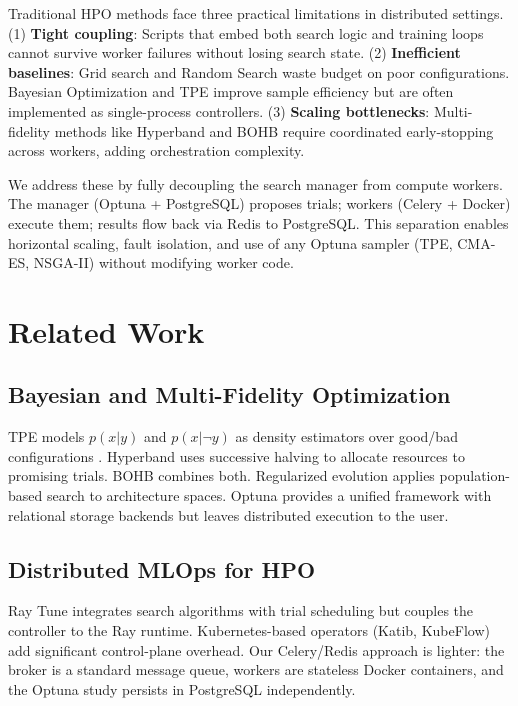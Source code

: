\documentclass[10pt,twocolumn,letterpaper]{article}
\begin{document}
Traditional HPO methods face three practical limitations in distributed settings. (1) \textbf{Tight coupling}: Scripts that embed both search logic and training loops cannot survive worker failures without losing search state. (2) \textbf{Inefficient baselines}: Grid search and Random Search \cite{bergstra2012random} waste budget on poor configurations. Bayesian Optimization \cite{snoek2012practical} and TPE \cite{bergstra2011algorithms} improve sample efficiency but are often implemented as single-process controllers. (3) \textbf{Scaling bottlenecks}: Multi-fidelity methods like Hyperband \cite{li2017hyperband} and BOHB \cite{falkner2018bohb} require coordinated early-stopping across workers, adding orchestration complexity.

We address these by fully decoupling the search manager from compute workers. The manager (Optuna + PostgreSQL) proposes trials; workers (Celery + Docker) execute them; results flow back via Redis to PostgreSQL. This separation enables horizontal scaling, fault isolation, and use of any Optuna sampler (TPE, CMA-ES, NSGA-II) without modifying worker code.

\section{Related Work}
\subsection{Bayesian and Multi-Fidelity Optimization}
TPE models $p(x|y)$ and $p(x|\neg y)$ as density estimators over good/bad configurations \cite{bergstra2011algorithms}. Hyperband \cite{li2017hyperband} uses successive halving to allocate resources to promising trials. BOHB \cite{falkner2018bohb} combines both. Regularized evolution \cite{real2019regularized} applies population-based search to architecture spaces. Optuna \cite{akiba2019optuna} provides a unified framework with relational storage backends but leaves distributed execution to the user.

\subsection{Distributed MLOps for HPO}
Ray Tune \cite{moritz2018ray} integrates search algorithms with trial scheduling but couples the controller to the Ray runtime. Kubernetes-based operators (Katib, KubeFlow) add significant control-plane overhead. Our Celery/Redis approach is lighter: the broker is a standard message queue, workers are stateless Docker containers, and the Optuna study persists in PostgreSQL independently.
\end{document}
